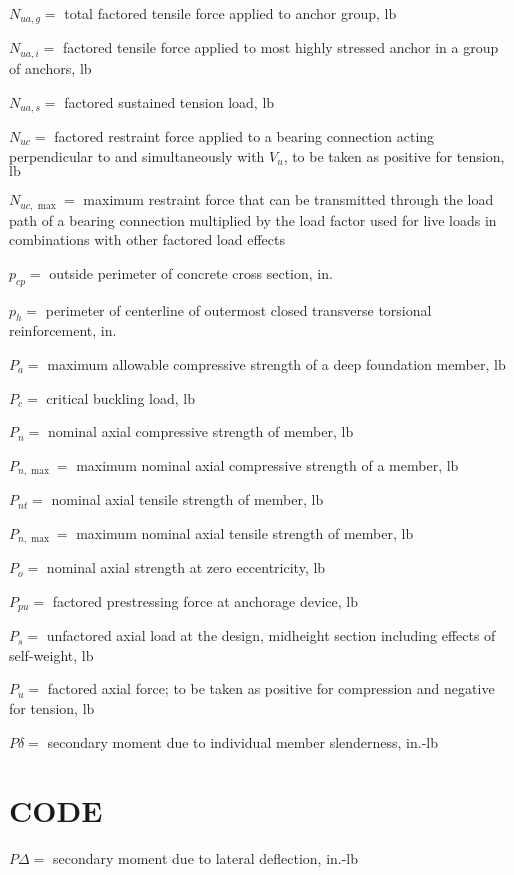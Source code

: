 \documentclass[10pt]{article}
\begin{document}
$N_{u a, g}=$ total factored tensile force applied to anchor group, $\mathrm{lb}$

$N_{u a, i}=$ factored tensile force applied to most highly stressed anchor in a group of anchors, lb

$N_{u a, s}=$ factored sustained tension load, $\mathrm{lb}$

$N_{u c}=$ factored restraint force applied to a bearing connection acting perpendicular to and simultaneously with $V_{u}$, to be taken as positive for tension, $\mathrm{lb}$

$N_{u c, \text { max }}=$ maximum restraint force that can be transmitted through the load path of a bearing connection multiplied by the load factor used for live loads in combinations with other factored load effects

$p_{c p}=$ outside perimeter of concrete cross section, in.

$p_{h}=$ perimeter of centerline of outermost closed transverse torsional reinforcement, in.

$P_{a}=$ maximum allowable compressive strength of a deep foundation member, $\mathrm{lb}$

$P_{c}=$ critical buckling load, $\mathrm{lb}$

$P_{n}=$ nominal axial compressive strength of member, $\mathrm{lb}$

$P_{n, \max }=$ maximum nominal axial compressive strength of a member, $\mathrm{lb}$

$P_{n t}=$ nominal axial tensile strength of member, $\mathrm{lb}$

$P_{n, \max }=$ maximum nominal axial tensile strength of member, $\mathrm{lb}$

$P_{o}=$ nominal axial strength at zero eccentricity, $\mathrm{lb}$

$P_{p u}=$ factored prestressing force at anchorage device, $\mathrm{lb}$

$P_{s}=$ unfactored axial load at the design, midheight section including effects of self-weight, $\mathrm{lb}$

$P_{u}=$ factored axial force; to be taken as positive for compression and negative for tension, $\mathrm{lb}$

$P \delta=$ secondary moment due to individual member slenderness, in.-lb

\section*{CODE}
$P \Delta=$ secondary moment due to lateral deflection, in.-lb
\end{document}
